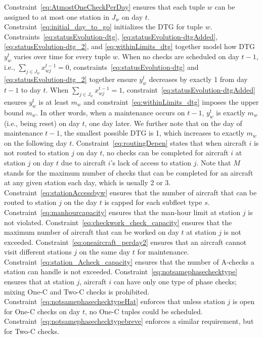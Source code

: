 Constraint~\eqref{eq:AtmostOneCheckPerDay} ensures that each tuple $w$ can be assigned to at most one station in $J_w$ on day $t$.
Constraint~\eqref{eq:initial_day_to_go} initializes the DTG for tuple $w$. Constraints~\eqref{eq:statusEvolution-dtg}, \eqref{eq:statusEvolution-dtgAdded}, \eqref{eq:statusEvolution-dtg_2}, and \eqref{eq:withinLimits_dtg} together model how DTG $y_w^t$ varies over time for every tuple $w$. 
When no checks are scheduled on day $t-1$, i.e., $\sum_{j \in J_w} x_{wj}^{t-1} = 0$, constraints~\eqref{eq:statusEvolution-dtg} and \eqref{eq:statusEvolution-dtg_2} together ensure $y_w^t$ decreases by exactly 1 from day $t-1$ to day $t$. 
When $\sum_{j \in J_w} x_{wj}^{t-1} = 1$, constraint~\eqref{eq:statusEvolution-dtgAdded} ensures $y_w^t$ is at least $m_w$ and constraint~\eqref{eq:withinLimits_dtg} imposes the upper bound $m_w$. In other words, when a maintenance occurs on $t-1$, $y_w^t$ is exactly $m_w$ (i.e., being reset) on day $t$, one day later. We further note that on the day of maintenance $t-1$, the smallest possible DTG is 1, which increases to exactly $m_w$ on the following day $t$.
Constraint~\eqref{eq:routingDepen} states that when aircraft $i$ is not routed to station $j$ on day $t$, no checks can be completed for aircraft $i$ at station $j$ on day $t$ due to aircraft $i$'s lack of access to station $j$. Note that $M$ stands for the maximum number of checks that can be completed for an aircraft at any given station each day, which is usually 2 or 3.
Constraint~\eqref{eq:stationAccessbyw} ensures that the number of aircraft that can be routed to station $j$ on the day $t$ is capped for each subfleet type $s$.
Constraint~\eqref{eq:manhourcapacity} ensures that the man-hour limit at station $j$ is not violated. 
Constraint~\eqref{eq:checkwork_check_capacity} ensures that the maximum number of aircraft that can be worked on day $t$ at station $j$ is not exceeded. 
Constraint~\eqref{eq:oneaircraft_perday2} ensures that an aircraft cannot visit different stations $j$ on the same day $t$ for maintenance.
Constraint~\eqref{eq:station_Acheck_capacity} ensures that the number of A-checks a station can handle is not exceeded. 
Constraint~\eqref{eq:notsamephasechecktype} ensures that at station $j$, aircraft $i$ can have only one type of phase checks; mixing One-C and Two-C checks is prohibited. Constraint~\eqref{eq:notsamephasechecktypeHat} enforces that unless station $j$ is open for One-C checks on day $t$, no One-C tuples could be scheduled. Constraint~\eqref{eq:notsamephasechecktypebreve} enforces a similar requirement, but for Two-C checks.
